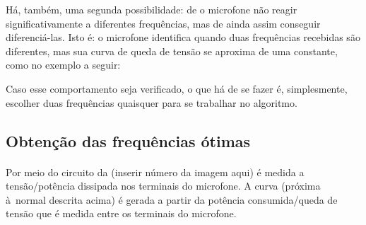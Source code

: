 \documentclass[10pt,a4paper]{report}
\begin{document}
	
	\begin{center}
	\end{center}


Há, também, uma segunda possibilidade: de o microfone não reagir significativamente a diferentes frequências, mas de ainda assim conseguir diferenciá-las. Isto é: o microfone identifica quando duas frequências recebidas são diferentes, mas sua curva de queda de tensão se aproxima de uma constante, como no exemplo a seguir:


\begin{center}
\end{center}


	Caso esse comportamento seja verificado, o que há de se fazer é, simplesmente, escolher duas frequências quaisquer para se trabalhar no algoritmo.

\subsection{Obtenção das frequências ótimas}
\paragraph{}
Por meio do circuito da (inserir número da imagem aqui) é medida a tensão/potência dissipada nos terminais do microfone. A curva (próxima à normal descrita acima) é gerada a partir da potência consumida/queda de tensão que é medida entre os terminais do microfone.
\end{document}
